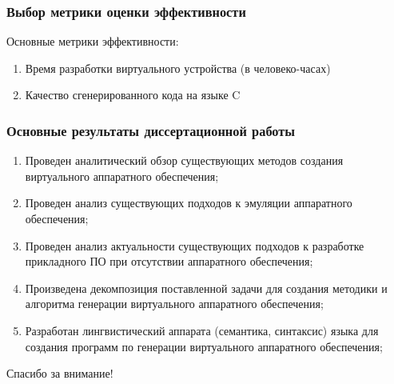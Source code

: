 \begin{frame}%
    \frametitle{Выбор метрики оценки эффективности}
    Основные метрики эффективности:
    \begin{enumerate}
        \item Время разработки виртуального устройства (в человеко-часах)
        \item Качество сгенерированного кода на языке C
    \end{enumerate}
\end{frame}


\begin{frame}%
    \frametitle{Основные результаты диссертационной работы}
    \begin{enumerate}
        \item Проведен аналитический обзор существующих методов создания виртуального аппаратного обеспечения;
        \item Проведен анализ существующих подходов к эмуляции аппаратного обеспечения;
        \item Проведен анализ актуальности существующих подходов к разработке прикладного ПО при отсутствии аппаратного обеспечения;
        \item Произведена декомпозиция поставленной задачи для создания методики и алгоритма генерации виртуального аппаратного обеспечения;
        \item Разработан лингвистический аппарата (семантика, синтаксис) языка для создания программ по генерации виртуального
            аппаратного обеспечения;
    \end{enumerate}
\end{frame}


\begin{frame}%
    \begin{center}
        \Huge Спасибо за внимание!
    \end{center}
\end{frame}
